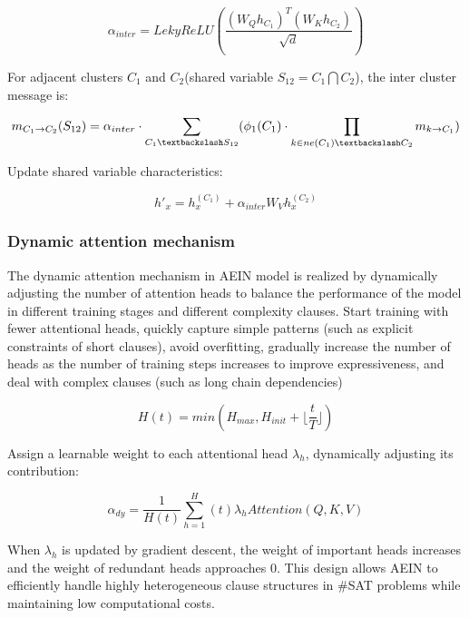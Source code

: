 \begin{equation}
\alpha_{inter}=LekyReLU(\frac{(W_Qh_{C_1})^T(W_Kh_{C_2})}{\sqrt{d}})
\end{equation}

For adjacent clusters \(C_1\) and \(C_2\)(shared variable \(S_{12}=C_1\bigcap C_2\)), the inter cluster 
message is:

\begin{equation}
    m_{C_1\rightarrow C_2}(S_{12})=\alpha_{inter}\cdot\sum_{C_1\textbackslash 
    S_{12}}(\phi_1(C_1)\cdot\prod_{k\in ne(C_1)\textbackslash C_2}m_{k\rightarrow C_1})
\end{equation}

Update shared variable characteristics:

\begin{equation}
h'_x=h_x^{(C_1)}+\alpha_{inter}W_Vh_x^{(C_2)}
\end{equation}

\subsubsection{Dynamic attention mechanism}
The dynamic attention mechanism in AEIN model is realized by dynamically adjusting the number of 
attention heads to balance the performance of the model in different training stages and different 
complexity clauses. Start training with fewer attentional heads, quickly capture simple patterns 
(such as explicit constraints of short clauses), avoid overfitting, gradually increase the number of 
heads as the number of training steps increases to improve expressiveness, and deal with complex 
clauses (such as long chain dependencies) 

\begin{equation}
H(t)=min(H_{max},H_{init}+\lfloor\frac{t}{T}\rfloor)
\end{equation}

Assign a learnable weight to each attentional head \(\lambda_h\), dynamically adjusting its contribution:

\begin{equation}
\alpha_{dy}=\frac{1}{H(t)}\sum_{h=1}^H(t) \lambda_h Attention(Q,K,V)
\end{equation}

When \(\lambda_h\) is updated by gradient descent, the weight of important heads increases and 
the weight of redundant heads approaches 0.
This design allows AEIN to efficiently handle highly heterogeneous clause structures in \#SAT problems 
while maintaining low computational costs.

